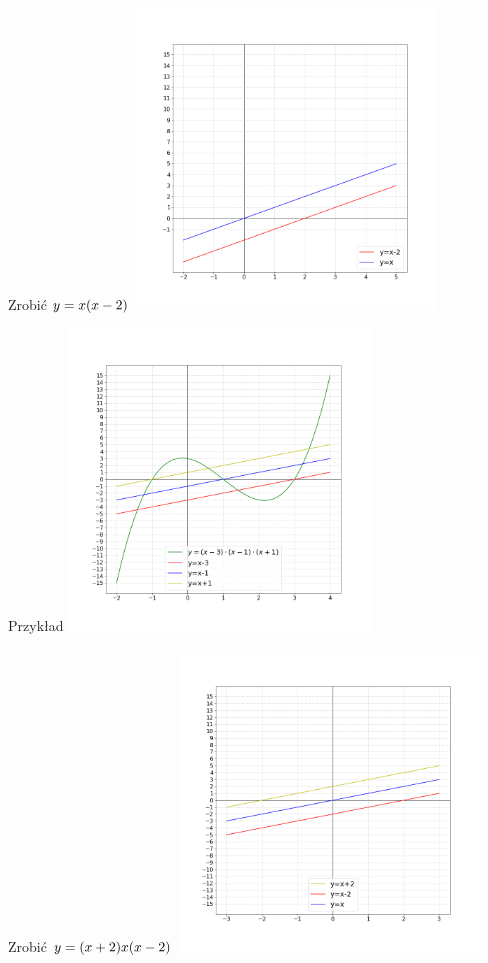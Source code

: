 \documentclass[]{letter}
\begin{document}
Zrobić $\Large y = x(x-2)$
\includegraphics[width=8cm,height=8cm]{pics/graph_mult_4.png}


Przykład
\includegraphics[width=8cm,height=8cm]{pics/graph_mult_5.png}


Zrobić $\Large y = (x+2) x (x-2)$
\includegraphics[width=8cm,height=8cm]{pics/graph_mult_6.png}
\end{document}
